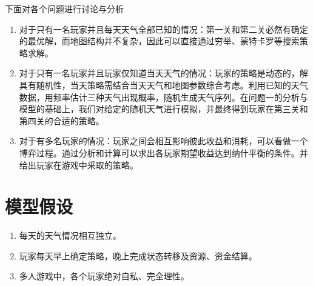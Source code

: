 \documentclass[withoutpreface,bwprint]{cumcmthesis} %
\begin{document}
下面对各个问题进行讨论与分析
\begin{enumerate}
    \item 对于只有一名玩家并且每天天气全部已知的情况：第一关和第二关必然有确定的最优解，而地图结构并不复杂，因此可以直接通过穷举、蒙特卡罗\cite{mc}等搜索策略求解。

    \item 对于只有一名玩家并且玩家仅知道当天天气的情况：玩家的策略是动态的，解具有随机性，当天策略需结合当天天气和地图参数综合考虑。利用已知的天气数据，用频率估计三种天气出现概率，随机生成天气序列。在问题一的分析与模型的基础上，我们对给定的随机天气进行模拟，并最终得到玩家在第三关和第四关的合适的策略。
    
    \item 对于有多名玩家的情况：玩家之间会相互影响彼此收益和消耗，可以看做一个博弈过程。通过分析和计算可以求出各玩家期望收益达到纳什平衡\cite{nashi}的条件。并给出玩家在游戏中采取的策略。
\end{enumerate}

\section{模型假设}
\begin{enumerate}
    \item 每天的天气情况相互独立。
    \item 玩家每天早上确定策略，晚上完成状态转移及资源、资金结算。
    \item 多人游戏中，各个玩家绝对自私、完全理性。
\end{enumerate}
\end{document}
